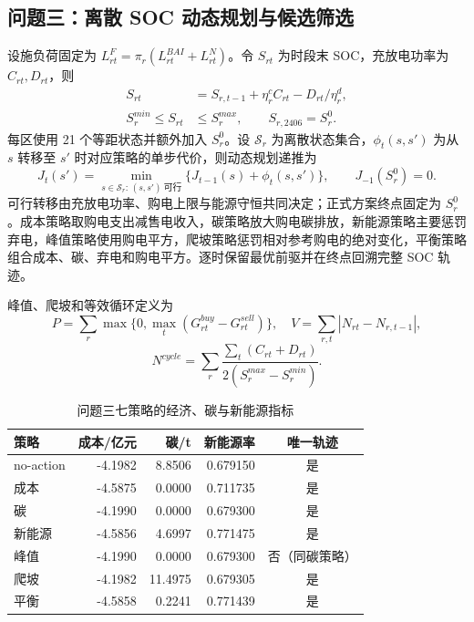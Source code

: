 \documentclass[withoutpreface,bwprint]{cumcmthesis}
\begin{document}
\subsection{问题三：离散 SOC 动态规划与候选筛选}
设施负荷固定为 $L^F_{rt}=\pi_r(L^{BAI}_{rt}+L^N_{rt})$。令 $S_{rt}$ 为时段末 SOC，充放电功率为 $C_{rt},D_{rt}$，则
\begin{align}
S_{rt}&=S_{r,t-1}+\eta_r^cC_{rt}-D_{rt}/\eta_r^d,\\
S_r^{min}\le S_{rt}&\le S_r^{max},\qquad S_{r,2406}=S_r^0.
\end{align}
每区使用 21 个等距状态并额外加入 $S_r^0$。设 $\mathcal S_r$ 为离散状态集合，$\phi_t(s,s')$ 为从 $s$ 转移至 $s'$ 时对应策略的单步代价，则动态规划递推为
\begin{equation}
J_t(s')=\min_{s\in\mathcal S_r:\,(s,s')\ \text{可行}}\{J_{t-1}(s)+\phi_t(s,s')\},
\qquad J_{-1}(S_r^0)=0.
\end{equation}
可行转移由充放电功率、购电上限与能源守恒共同决定；正式方案终点固定为 $S_r^0$。成本策略取购电支出减售电收入，碳策略放大购电碳排放，新能源策略主要惩罚弃电，峰值策略使用购电平方，爬坡策略惩罚相对参考购电的绝对变化，平衡策略组合成本、碳、弃电和购电平方。逐时保留最优前驱并在终点回溯完整 SOC 轨迹。

峰值、爬坡和等效循环定义为
\begin{equation}
P=\sum_r\max\{0,\max_t(G^{buy}_{rt}-G^{sell}_{rt})\},\quad
V=\sum_{r,t}|N_{rt}-N_{r,t-1}|,
\end{equation}
\begin{equation}
N^{cycle}=\sum_r\frac{\sum_t(C_{rt}+D_{rt})}{2(S_r^{max}-S_r^{min})}.
\end{equation}

\begin{table}[H]\centering
{\small
\caption{问题三七策略的经济、碳与新能源指标}\label{tab:q3policies}
\begin{tabular}{lrrrc}\toprule
策略 & 成本/亿元 & 碳/t & 新能源率 & 唯一轨迹\\\midrule
no-action & -4.1982 & 8.8506 & 0.679150 & 是\\
成本 & -4.5875 & 0.0000 & 0.711735 & 是\\
碳 & -4.1990 & 0.0000 & 0.679300 & 是\\
新能源 & -4.5856 & 4.6997 & 0.771475 & 是\\
峰值 & -4.1990 & 0.0000 & 0.679300 & 否（同碳策略）\\
爬坡 & -4.1982 & 11.4975 & 0.679305 & 是\\
平衡 & -4.5858 & 0.2241 & 0.771439 & 是\\\bottomrule
\end{tabular}
}
\end{table}
\end{document}
